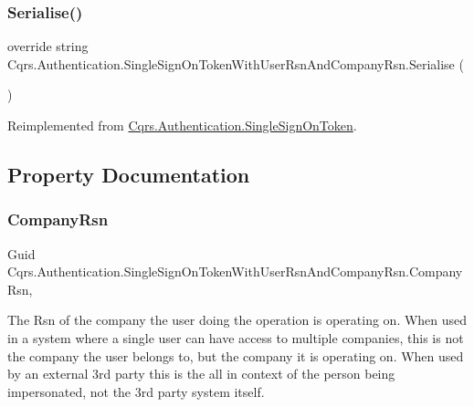 \subsubsection{\texorpdfstring{Serialise()}{Serialise()}}
{\footnotesize\ttfamily override string Cqrs.\+Authentication.\+Single\+Sign\+On\+Token\+With\+User\+Rsn\+And\+Company\+Rsn.\+Serialise (\begin{DoxyParamCaption}{ }\end{DoxyParamCaption})\hspace{0.3cm}{\ttfamily [virtual]}}



Reimplemented from \hyperlink{classCqrs_1_1Authentication_1_1SingleSignOnToken_a5e859c6c5db5aaa9ef4e8f2086df4604}{Cqrs.\+Authentication.\+Single\+Sign\+On\+Token}.



\subsection{Property Documentation}
\mbox{\label{classCqrs_1_1Authentication_1_1SingleSignOnTokenWithUserRsnAndCompanyRsn_ae81ee4a4935b762a1ed2504ea321c517}} 
\subsubsection{\texorpdfstring{Company\+Rsn}{CompanyRsn}}
{\footnotesize\ttfamily Guid Cqrs.\+Authentication.\+Single\+Sign\+On\+Token\+With\+User\+Rsn\+And\+Company\+Rsn.\+Company\+Rsn\hspace{0.3cm}{\ttfamily [get]}, {\ttfamily [set]}}



The Rsn of the company the user doing the operation is operating on. When used in a system where a single user can have access to multiple companies, this is not the company the user belongs to, but the company it is operating on. When used by an external 3rd party this is the all in context of the person being impersonated, not the 3rd party system itself. 

